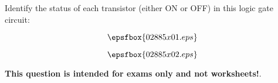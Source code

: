 

Identify the status of each transistor (either ON or OFF) in this logic gate circuit:

$$\epsfbox{02885x01.eps}$$







$$\epsfbox{02885x02.eps}$$







{\bf This question is intended for exams only and not worksheets!}.





